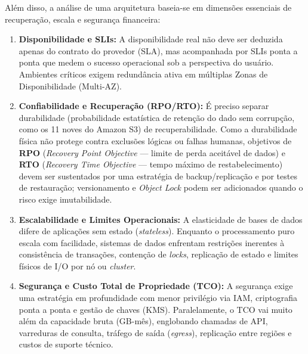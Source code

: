\documentclass[11pt,a4paper]{article}
\begin{document}
Além disso, a análise de uma arquitetura baseia-se em dimensões essenciais de recuperação, escala e segurança financeira:

\begin{enumerate}[leftmargin=*]
    \item \textbf{Disponibilidade e SLIs:} A disponibilidade real não deve ser deduzida apenas do contrato do provedor (SLA), mas acompanhada por SLIs ponta a ponta que medem o sucesso operacional sob a perspectiva do usuário. Ambientes críticos exigem redundância ativa em múltiplas Zonas de Disponibilidade (Multi-AZ).
    \item \textbf{Confiabilidade e Recuperação (RPO/RTO):} É preciso separar durabilidade (probabilidade estatística de retenção do dado sem corrupção, como os 11 noves do Amazon S3) de recuperabilidade. Como a durabilidade física não protege contra exclusões lógicas ou falhas humanas, objetivos de \textbf{RPO} (\emph{Recovery Point Objective} --- limite de perda aceitável de dados) e \textbf{RTO} (\emph{Recovery Time Objective} --- tempo máximo de restabelecimento) devem ser sustentados por uma estratégia de backup/replicação e por testes de restauração; versionamento e \emph{Object Lock} podem ser adicionados quando o risco exige imutabilidade.
    \item \textbf{Escalabilidade e Limites Operacionais:} A elasticidade de bases de dados difere de aplicações sem estado (\emph{stateless}). Enquanto o processamento puro escala com facilidade, sistemas de dados enfrentam restrições inerentes à consistência de transações, contenção de \emph{locks}, replicação de estado e limites físicos de I/O por nó ou \emph{cluster}.
    \item \textbf{Segurança e Custo Total de Propriedade (TCO):} A segurança exige uma estratégia em profundidade com menor privilégio via IAM, criptografia ponta a ponta e gestão de chaves (KMS). Paralelamente, o TCO vai muito além da capacidade bruta (GB-mês), englobando chamadas de API, varreduras de consulta, tráfego de saída (\emph{egress}), replicação entre regiões e custos de suporte técnico.
\end{enumerate}
\end{document}
